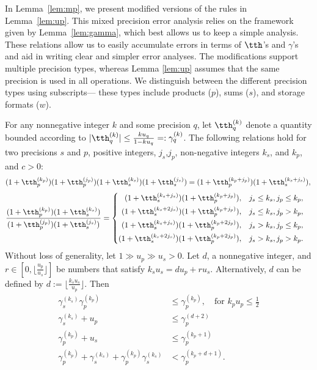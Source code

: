 In Lemma~\ref{lem:mp}, we present modified versions of the rules in Lemma~\ref{lem:up}.
This mixed precision error analysis relies on the framework given by Lemma~\ref{lem:gamma}, which best allows us to keep a simple analysis. 
These relations allow us to easily accumulate errors in terms of $\tth$'s and $\gamma$'s and aid in writing clear and simpler error analyses.
The modifications support multiple precision types, whereas Lemma \ref{lem:up} assumes that the same precision is used in all operations. 
We distinguish between the different precision types using subscripts--- these types include products ($p$), sums ($s$), and storage formats ($w$).

\begin{lemma}%
	\label{lem:mp}
	For any nonnegative integer $k$ and some precision $q$, let $\tth_{q}^{(k)}$ denote a quantity bounded according to $|\tth_q^{(k)}|\leq \frac{k u_q }{1-ku_q} =:\gamma_{q}^{(k)}$.
	The following relations hold for two precisions $s$ and $p$, positive integers, $j_s$,$j_p$, non-negative integers $k_s$, and $k_p$, and $c>0$:
	\begin{equation}
	(1+\tth_{p}^{(k_p)})(1+\tth_{p}^{(j_p)})(1+\tth_{s}^{(k_s)})(1+\tth_{s}^{(j_s)})=(1+\tth_{p}^{(k_p+j_p)})(1+\tth_{s}^{(k_s+j_s)}), \\
	\end{equation}
	\begin{align}
	\frac{(1+\tth_{p}^{(k_p)})(1+\tth_{s}^{(k_s)})}{(1+\tth_{p}^{(j_p)})(1+\tth_{s}^{(j_s)})} &=\left\{\begin{alignedat}{2}
	(1+\tth_{s}^{(k_s+j_s)})(1+\tth_{p}^{(k_p+j_p)})&,\quad& j_s \leq k_s, j_p \leq k_p,\\
	(1+\tth_{s}^{(k_s+2j_s)})(1+\tth_{p}^{(k_p+j_p)})&,\quad& j_s \leq k_s, j_p > k_p,\\
	(1+\tth_{s}^{(k_s+j_s)})(1+\tth_{p}^{(k_p+2j_p)})&,\quad& j_s > k_s, j_p \leq k_p,\\
	(1+\tth_{s}^{(k_s+2j_s)})(1+\tth_{p}^{(k_p+2j_p)})&,\quad& j_s > k_s, j_p > k_p.
	\end{alignedat}\right.
	\end{align}
	Without loss of generality, let $1 \gg u_p \gg u_s>0$.
	Let $d$, a nonnegative integer, and $r\in[0, \lfloor\frac{u_p}{u_s}\rfloor]$ be numbers that satisfy $k_su_s = d u_p + r u_s$. 
	Alternatively, $d$ can be defined by $d := \lfloor\frac{k_su_s}{u_p}\rfloor$.
	Then
	\begin{align}
	\gamma_{s}^{(k_s)}\gamma_{p}^{(k_p)} &\leq \gamma_{p}^{(k_p)}, \quad\text{for } k_p u_p \leq \frac{1}{2}  \\
	\gamma_{s}^{(k_s)}+u_p &\leq \gamma_{p}^{(d+2)} \\
	\gamma_{p}^{(k_p)} + u_{s} &\leq \gamma_{p}^{(k_p+1)} \\ %
	\gamma_{p}^{(k_p)}+\gamma_{s}^{(k_s)}+\gamma_{p}^{(k_p)}\gamma_{s}^{(k_s)} & < \gamma_{p}^{(k_p+ d+ 1)}. \label{lem:mp1}
	\end{align} 
\end{lemma}

